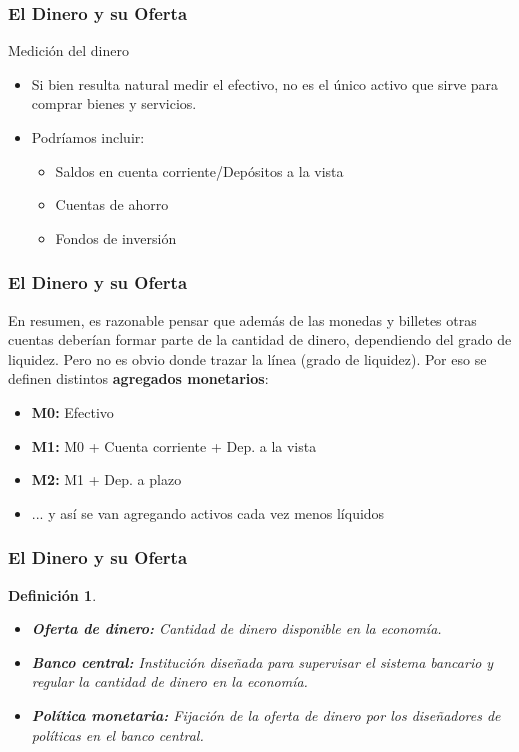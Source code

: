 \documentclass[dvipsnames,table,leqno]{beamer}
\newtheorem{mydef}{Definición}
\begin{document}
		\begin{frame}
			\frametitle{El Dinero y su Oferta}
			Medición del dinero
			\begin{itemize}
				\item Si bien resulta natural medir el efectivo, no es el único activo que sirve para comprar bienes y servicios.
				\item Podríamos incluir:
					\begin{itemize}
						\item Saldos en cuenta corriente/Depósitos a la vista
						\item Cuentas de ahorro
						\item Fondos de inversión
					\end{itemize}
			\end{itemize}
		\end{frame}	

		\begin{frame}
			\frametitle{El Dinero y su Oferta}
			En resumen, es razonable pensar que además de las monedas y billetes otras cuentas deberían formar parte de la cantidad de dinero, dependiendo del grado de liquidez. Pero no es obvio donde trazar la línea (grado de liquidez). Por eso se definen distintos \textbf{agregados monetarios}:
			\begin{itemize}
				\item \textbf{M0:} Efectivo
				\item \textbf{M1:} M0 + Cuenta corriente + Dep. a la vista
				\item \textbf{M2:} M1 + Dep. a plazo
				\item ... y así se van agregando activos cada vez menos líquidos
			\end{itemize}
		\end{frame}	

		\begin{frame}
			\frametitle{El Dinero y su Oferta}
			\begin{mydef}
				\begin{itemize}
					\item \textbf{Oferta de dinero:} Cantidad de dinero disponible en la economía.
					\item \textbf{Banco central:} Institución diseñada para supervisar el sistema bancario y regular la cantidad de dinero en la economía.
					\item \textbf{Política monetaria:} Fijación de la oferta de dinero por los diseñadores de políticas en el banco central.
				\end{itemize}
			\end{mydef}
		\end{frame}	
\end{document}
